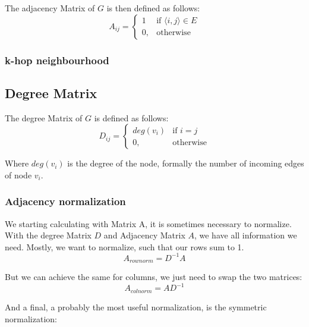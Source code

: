 The adjacency Matrix of $G$ is then defined as follows:
\begin{equation}
    A_{ij} =    
    \begin{cases}
        1  & \text{if } \langle i,j \rangle \in E \\
        0, & \text{otherwise}
    \end{cases}
\end{equation}

\subsubsection{k-hop neighbourhood}

\subsection{Degree Matrix}

The degree Matrix of $G$ is defined as follows:
\begin{equation}
    D_{ij} =    
    \begin{cases}
        deg(v_i)  & \text{if } i = j \\
        0, & \text{otherwise}
    \end{cases}
\end{equation}

Where $deg(v_i)$ is the degree of the node, formally the number of incoming edges of node $v_i$.

\subsubsection{Adjacency normalization}
We starting calculating with Matrix A, it is sometimes necessary to normalize.
With the degree Matrix $D$ and Adjacency Matrix $A$, we have all information we need.
Mostly, we want to normalize, such that our rows sum to 1.
\begin{equation}
    A_{rownorm} = D^{-1} A
\end{equation}

But we can achieve the same for columns, we just need to swap the two matrices:
\begin{equation}
    A_{colnorm} = A D^{-1}
\end{equation}

And a final, a probably the most useful normalization, is the symmetric normalization:

